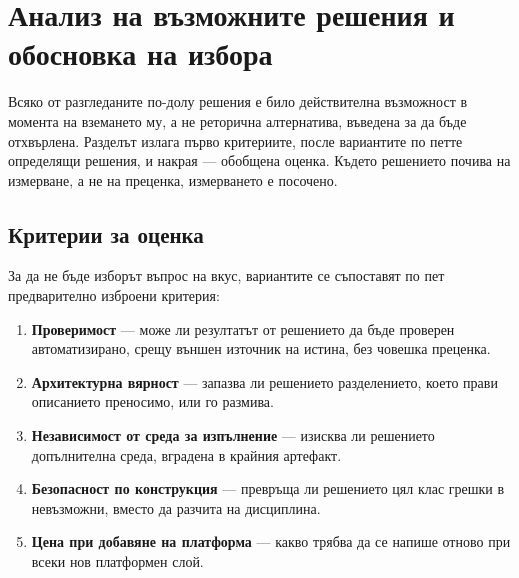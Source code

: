 %
\section{Анализ на възможните решения и обосновка на избора}
\label{sec:alternatives}

Всяко от разгледаните по-долу решения е било действителна възможност в момента на вземането
му, а не реторична алтернатива, въведена за да бъде отхвърлена. Разделът излага първо
критериите, после вариантите по петте определящи решения, и накрая --- обобщена оценка.
Където решението почива на измерване, а не на преценка, измерването е посочено.

\subsection{Критерии за оценка}
\label{subsec:criteria}

За да не бъде изборът въпрос на вкус, вариантите се съпоставят по пет предварително
изброени критерия:

\begin{enumerate}[topsep=2pt,itemsep=1pt,leftmargin=*,label=К\arabic*.]
\item \textbf{Проверимост} --- може ли резултатът от решението да бъде проверен
      автоматизирано, срещу външен източник на истина, без човешка преценка.
\item \textbf{Архитектурна вярност} --- запазва ли решението разделението, което прави
      описанието преносимо, или го размива.
\item \textbf{Независимост от среда за изпълнение} --- изисква ли решението
      допълнителна среда, вградена в крайния артефакт.
\item \textbf{Безопасност по конструкция} --- превръща ли решението цял клас грешки в
      невъзможни, вместо да разчита на дисциплина.
\item \textbf{Цена при добавяне на платформа} --- какво трябва да се напише отново при
      всеки нов платформен слой.
\end{enumerate}

